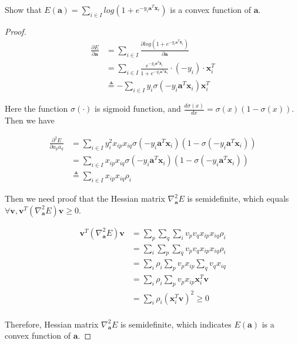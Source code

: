 \documentclass{article}
\begin{document}
Show that $E(\bm{a}) = \sum\limits_{i \in I} log(1+e^{-y_i\bm{a}^T\bm{x}_i})$ is a convex function of $\bm{a}$.

\begin{proof}

\begin{align*}
	\frac{\partial E}{\partial \bm{a}} &= \sum\limits_{i \in I} \frac{\partial log(1+e^{-y_i\bm{a}^T\bm{x}_i})}{\partial \bm{a}} \\
	&= \sum\limits_{i \in I} \frac{e^{-y_i\bm{a}^T\bm{x}_i}}{1+e^{-y_i\bm{a}^T\bm{x}_i}}\cdot(-y_i)\cdot\bm{x}_i^T \\
	&\triangleq -\sum\limits_{i \in I} y_i\sigma(-y_i\bm{a}^T\bm{x}_i)\bm{x}_i^T
\end{align*}

Here the function $\sigma(\cdot)$ is sigmoid function, and $\frac{d\sigma(x)}{dx}=\sigma(x)(1-\sigma(x))$. Then we have

\begin{align*}
	\frac{\partial^2 E}{\partial a_p a_q}
	&= \sum\limits_{i \in I} y_i^2x_{ip}x_{iq}\sigma(-y_i\bm{a}^T\bm{x}_i)(1-\sigma(-y_i\bm{a}^T\bm{x}_i)) \\
	&= \sum\limits_{i \in I} x_{ip}x_{iq}\sigma(-y_i\bm{a}^T\bm{x}_i)(1-\sigma(-y_i\bm{a}^T\bm{x}_i)) \\
	&\triangleq \sum\limits_{i \in I} x_{ip}x_{iq}\rho_i
\end{align*}

Then we need proof that the Hessian matrix $\nabla_{\bm{a}}^2E$ is semidefinite, which equals $\forall \bm{v}, \bm{v}^T(\nabla_{\bm{a}}^2E)\bm{v} \geq 0$.

\begin{align*}
	\bm{v}^T(\nabla_{\bm{a}}^2E)\bm{v}
	&= \sum\limits_p\sum\limits_q\sum\limits_i v_pv_qx_{ip}x_{iq}\rho_i \\
	&= \sum\limits_i\sum\limits_p\sum\limits_q v_pv_qx_{ip}x_{iq}\rho_i \\
	&= \sum\limits_i \rho_i \sum\limits_p v_px_{ip} \sum\limits_q v_qx_{iq} \\
	&= \sum\limits_i \rho_i \sum\limits_p v_px_{ip} \bm{x}_i^T\bm{v} \\
	&= \sum\limits_i \rho_i (\bm{x}_i^T\bm{v})^2 \geq 0 \\
\end{align*}

Therefore, Hessian matrix $\nabla_{\bm{a}}^2E$ is semidefinite, which indicates $E(\bm{a})$ is a convex function of $\bm{a}$.

\end{proof}
\end{document}
